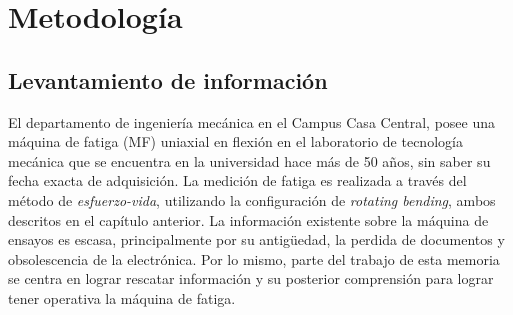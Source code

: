 \chapter{Metodología}
\section{Levantamiento de información}
El departamento de ingeniería mecánica en el Campus Casa Central, posee una máquina de fatiga (MF) uniaxial en flexión en el laboratorio de tecnología mecánica que se encuentra en la universidad hace más de 50 años, sin saber su fecha exacta de adquisición. La medición de fatiga es realizada a través del método de \textit{esfuerzo-vida}, utilizando la configuración de \textit{rotating bending}, ambos descritos en el capítulo anterior. La información existente sobre la máquina de ensayos es escasa, principalmente por su antigüedad, la perdida de documentos y obsolescencia de la electrónica. Por lo mismo, parte del trabajo de esta memoria se centra en lograr rescatar información y su posterior comprensión para lograr tener operativa la máquina de fatiga.

